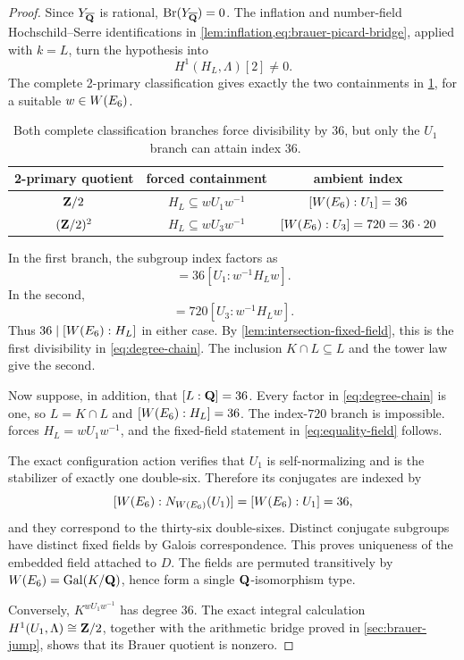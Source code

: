 \begin{proof}
Since \(Y_{\overline{\mathbf Q}}\) is rational,
\(\operatorname{Br}(Y_{\overline{\mathbf Q}})=0\).  The inflation and number-field Hochschild--Serre
identifications in \cref{lem:inflation,eq:brauer-picard-bridge}, applied with
\(k=L\), turn the hypothesis into
\[
 H^1(H_L,\Lambda)[2]\ne0.
\]
The complete 2-primary classification
\cite{SwinnertonDyer1993,ElsenhansJahnel2010Brauer} gives exactly the two
containments in \cref{tab:two-branches}, for a suitable \(w\in W(E_6)\).

\begin{table}[htbp]
\centering
\begin{tabular}{@{}ccc@{}}
\toprule
2-primary quotient & forced containment & ambient index\\
\midrule
\(\mathbf Z/2\) & \(H_L\subseteq wU_1w^{-1}\) & \([W(E_6):U_1]=36\)\\
\((\mathbf Z/2)^2\) & \(H_L\subseteq wU_3w^{-1}\) & \([W(E_6):U_3]=720=36\cdot20\)\\
\bottomrule
\end{tabular}
\caption{Both complete classification branches force divisibility by \(36\),
but only the \(U_1\) branch can attain index \(36\).}
\label{tab:two-branches}
\end{table}

In the first branch, the subgroup index factors as
\begin{equation}
 [\WE:H_L]
 =36[U_1:w^{-1}H_Lw].
\label{eq:u1-index-factor}
\end{equation}
In the second,
\begin{equation}
 [\WE:H_L]
 =720[U_3:w^{-1}H_Lw].
\label{eq:u3-index-factor}
\end{equation}
Thus \(36\mid[W(E_6):H_L]\) in either case.  By
\cref{lem:intersection-fixed-field}, this is the first divisibility in
\cref{eq:degree-chain}.  The inclusion \(K\cap L\subseteq L\) and the tower
law give the second.

Now suppose, in addition, that \([L:\mathbf Q]=36\).  Every factor in
\cref{eq:degree-chain} is one,
so \(L=K\cap L\) and \([W(E_6):H_L]=36\).  The index-\(720\) branch is
impossible.   forces
\(H_L=wU_1w^{-1}\), and the fixed-field statement in
\cref{eq:equality-field} follows.

The exact configuration action verifies that \(U_1\) is self-normalizing and
is the stabilizer of exactly one double-six.  Therefore its conjugates are
indexed by
\[
 [W(E_6):N_{W(E_6)}(U_1)]=[W(E_6):U_1]=36,
\]
and they correspond to the thirty-six double-sixes.  Distinct conjugate
subgroups have distinct fixed fields by Galois correspondence.  This proves
uniqueness of the embedded field attached to \(D\).  The fields are permuted
transitively by \(W(E_6)=\operatorname{Gal}(K/\mathbf Q)\), hence form a single
\(\mathbf Q\)-isomorphism type.

Conversely, \(K^{wU_1w^{-1}}\) has degree \(36\).  The exact integral
calculation \(H^1(U_1,\Lambda)\cong\mathbf Z/2\), together with the arithmetic bridge
proved in \cref{sec:brauer-jump}, shows that its Brauer quotient is nonzero.
\end{proof}

